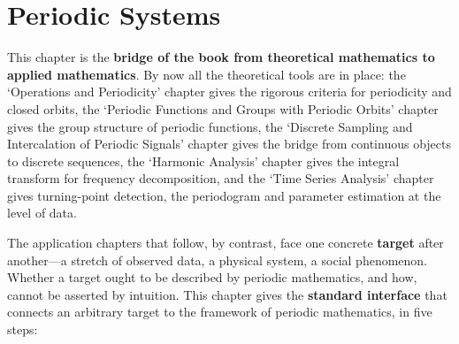 \chapter{Periodic Systems}
\label{chap:periodic_system}
\label{chap:periodic-system}

\begin{remark}\label{rem:periodic-system-positioning}
This chapter is the \textbf{bridge of the book from theoretical mathematics to applied mathematics}. By now all the theoretical tools are in place: the `Operations and Periodicity' chapter gives the rigorous criteria for periodicity and closed orbits, the `Periodic Functions and Groups with Periodic Orbits' chapter gives the group structure of periodic functions, the `Discrete Sampling and Intercalation of Periodic Signals' chapter gives the bridge from continuous objects to discrete sequences, the `Harmonic Analysis' chapter gives the integral transform for frequency decomposition, and the `Time Series Analysis' chapter gives turning-point detection, the periodogram and parameter estimation at the level of data.

The application chapters that follow, by contrast, face one concrete \textbf{target} after another---a stretch of observed data, a physical system, a social phenomenon. Whether a target ought to be described by periodic mathematics, and how, cannot be asserted by intuition. This chapter gives the \textbf{standard interface} that connects an arbitrary target to the framework of periodic mathematics, in five steps:


\end{remark}
